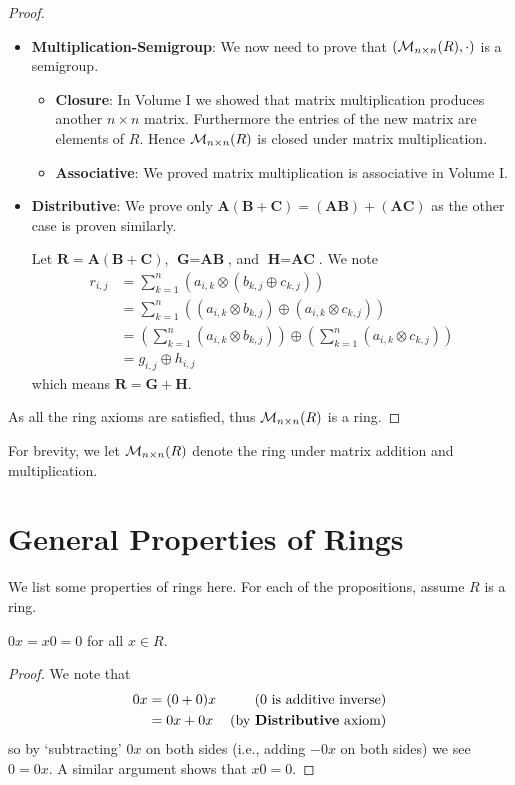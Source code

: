 \begin{proof}
\begin{itemize}
        \item \textbf{Multiplication-Semigroup}: We now need to prove that $(\mathcal{M}_{n\times n}(R), \cdot)$ is a semigroup.
        \begin{itemize}
            \item \textbf{Closure}: In Volume I we showed that matrix multiplication produces another $n \times n$ matrix. Furthermore the entries of the new matrix are elements of $R$. Hence $\mathcal{M}_{n\times n}(R)$ is closed under matrix multiplication.
        
            \item \textbf{Associative}: We proved matrix multiplication is associative in Volume I.
        \end{itemize}
        
        \item \textbf{Distributive}: We prove only $\textbf{A}(\textbf{B} + \textbf{C}) = (\textbf{AB}) + (\textbf{AC})$ as the other case is proven similarly.
        
        Let $\textbf{R} = \textbf{A}(\textbf{B} + \textbf{C})$, $\textbf{G} = \textbf{AB}$, and $\textbf{H} = \textbf{AC}$. We note
        \begin{align*}
            r_{i,j} &= \sum_{k=1}^n \left(a_{i,k} \otimes \left(b_{k,j} \oplus c_{k,j}\right)\right)\\
            &= \sum_{k=1}^n \left((a_{i,k} \otimes b_{k,j}) \oplus (a_{i,k} \otimes c_{k,j})\right)\\
            &= \left(\sum_{k=1}^n (a_{i,k} \otimes b_{k,j})\right) \oplus \left(\sum_{k=1}^n (a_{i,k} \otimes c_{k,j})\right)\\
            &= g_{i,j}\oplus h_{i,j}
        \end{align*}
        which means $\textbf{R} = \textbf{G} + \textbf{H}$.
    \end{itemize}
    As all the ring axioms are satisfied, thus $\mathcal{M}_{n\times n}(R)$ is a ring.
\end{proof}
For brevity, we let $\mathcal{M}_{n\times n}(R)$ denote the ring under matrix addition and multiplication.

\section{General Properties of Rings}
We list some properties of rings here. For each of the propositions, assume $R$ is a ring.

\begin{proposition}\label{prop-multiplying-by-zero-is-zero}
    $0x = x0 = 0$ for all $x \in R$.
\end{proposition}
\begin{proof}
    We note that
    \begin{align*}
        0x &= (0 + 0)x & (0 \text{ is additive inverse})\\
        &= 0x + 0x & (\text{by \textbf{Distributive} axiom})
    \end{align*}
    so by `subtracting' $0x$ on both sides (i.e., adding $-0x$ on both sides) we see $0 = 0x$. A similar argument shows that $x0 = 0$.
\end{proof}

